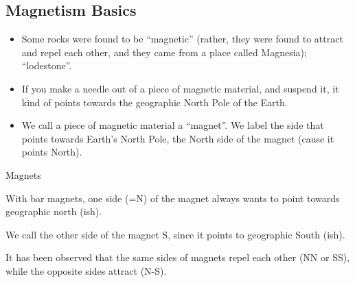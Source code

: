 \documentclass[aspectratio=169,
hyperref={colorlinks,urlcolor=blue}
]{beamer}
\begin{document}
\subsection{Magnetism Basics}
\label{subsec:magnetism}
{
\begin{itemize}
\item Some rocks were found to be ``magnetic'' (rather, they were found to attract and repel each other, and they came from a place called Magnesia); ``lodestone''.
\item If you make a needle out of a piece of magnetic material, and suspend it, it kind of points towards the geographic North Pole of the Earth.
\item We call a piece of magnetic material a ``magnet''. We label the side that points towards Earth’s North Pole, the North side of the magnet (cause it points North).
\end{itemize}
}
{
\vspace{-0.5cm}
\vspace{-0.75cm}
}



\begin{bulletframe}{Magnets}
\item With bar magnets, one side (=N) of the magnet always wants to point towards geographic north (ish).
\item We call the other side of the magnet S, since it points to geographic South (ish).
\item It has been observed that the same sides of magnets repel each other (NN or SS), while the opposite sides attract (N-S).
\end{bulletframe}

\end{document}
